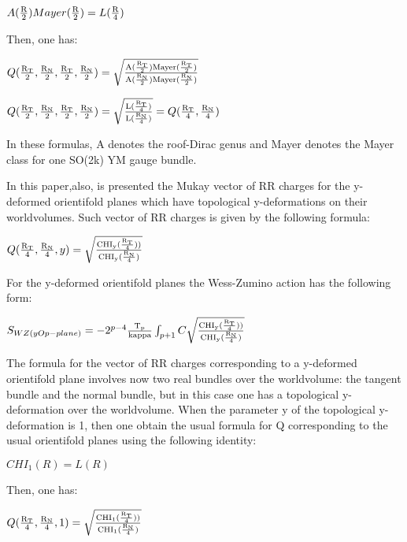 \documentclass[a4paper,a4paper]{article}
\begin{document}
\begin{center}
 
{  $A(\frac{\rm R}{\rm 2})Mayer(\frac{\rm R}{\rm 2}) 
 = L(\frac{\rm R}{\rm 4})$}
\end{center} 

Then, one has:

\begin{center}
{  $ Q(\frac{\rm R_T}{\rm 2},\frac{\rm R_N}{\rm 2},\frac{\rm R_T}{\rm 2},\frac{\rm R_N}{\rm 2}) =\sqrt{\frac{\rm A(\frac{\rm R_T}{\rm 2})Mayer(\frac{\rm R_T}{\rm 2})}{\rm A(\frac{\rm R_N}{\rm 2})Mayer(\frac{\rm R_N}{\rm 2})}} $ }
\end{center}

\begin{center}
{  $ Q(\frac{\rm R_T}{\rm 2},\frac{\rm R_N}{\rm 2},\frac{\rm R_T}{\rm 2},\frac{\rm R_N}{\rm 2}) =\sqrt{\frac{\rm L(\frac{\rm R_T}{\rm 4})}{\rm L(\frac{\rm R_N}{\rm 4})}}=Q(\frac{\rm R_T}{\rm 4},\frac{\rm R_N}{\rm 4}) $ }
\end{center}

In these formulas, A denotes the roof-Dirac genus and Mayer denotes the Mayer class for one SO(2k) YM gauge bundle.

In this paper,also, is presented the Mukay vector of RR charges for the y-deformed  orientifold planes which have topological y-deformations on their worldvolumes.  Such vector of RR charges is given by the following formula:

\begin{center}
{  $ Q(\frac{\rm R_T}{\rm 4},\frac{\rm R_N}{\rm 4},y) =\sqrt{\frac{\rm CHI_y(\frac{\rm R_T}{\rm 4}) )}{\rm CHI_y(\frac{\rm R_N}{\rm 4})}} $ }
\end{center}

For the y-deformed  orientifold planes the Wess-Zumino action has the following form:

\begin{center}
{  $ S_{WZ(yOp-plane)} = -2^{p-4}\frac{\rm T_p}{\rm kappa}\int_{p+1} C\sqrt{\frac{\rm CHI_y(\frac{\rm R_T}{\rm 4}) )}{\rm CHI_y(\frac{\rm R_N}{\rm 4})}}$ }
\end{center}
The formula for the vector of RR charges corresponding to a y-deformed orientifold plane involves now two real bundles over the worldvolume: the 
tangent bundle and  the normal bundle, but in this case one has a topological y-deformation over the worldvolume.
When the parameter y of the topological y-deformation is 1, then one obtain the usual formula for Q corresponding to the usual orientifold planes using the following identity:
\begin{center}
 
{  $ 
 CHI_1(R)= L(R)$}
\end{center} 
Then, one has:
\begin{center}
{  $ Q(\frac{\rm R_T}{\rm 4},\frac{\rm R_N}{\rm 4},1) = \sqrt{\frac{\rm CHI_1(\frac{\rm R_T}{\rm 4}) )}{\rm CHI_1(\frac{\rm R_N}{\rm 4})}}$ }
\end{center}
\end{document}
